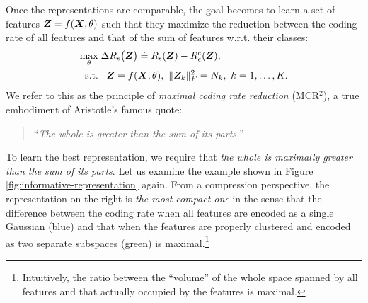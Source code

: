 \documentclass[../../book-main.tex]{subfiles}
\begin{document}
Once the representations are comparable, the goal becomes to learn a set of features $\bm{Z}  = f(\bm{X}, \theta)$  such that they maximize the reduction between the coding rate of all features and that of the sum of features w.r.t. their classes:
\begin{equation}
	\begin{aligned}
		\max_{\theta } & \;  \Delta R_{\epsilon}\big(\Z \big) \doteq R_{\epsilon}(\Z) - R_{\epsilon}^c(\Z ), \\
		\mbox{s.t.} & \ \ \, \Z = f(\bm X, \theta),\  \|\Z_k\|_F^2                                          = N_k,\ k=1,\dots,K. 
	\end{aligned}
	\label{eqn:maximal-rate-reduction}
\end{equation}
We refer to this as the principle of {\em maximal coding rate reduction} (MCR$^2$),
a true embodiment of Aristotle's famous quote:
\begin{quote}
	\centering
	``{\em The whole is greater than the sum of its parts.}''
\end{quote}
To learn the best representation, we require that {\em the whole is maximally greater than the sum of its parts}. Let us examine the example shown in Figure \ref{fig:informative-representation} again. From a compression perspective, the representation on the right is {\em the most compact one} in the sense that the difference between the coding rate when all features are encoded as a single Gaussian (blue) and that when the features are properly clustered and encoded as two separate subspaces (green) is maximal.\footnote{Intuitively, the ratio between the ``volume'' of the whole space spanned by all features and that actually occupied by the features is maximal.}
\end{document}
